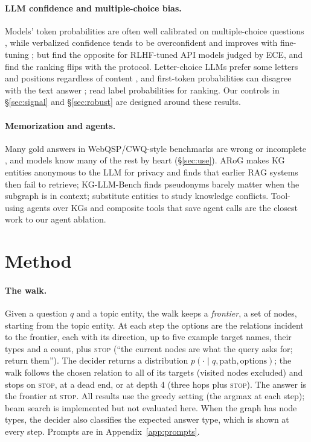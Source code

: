 \documentclass[11pt]{article}
\newcommand{\stopop}{\textsc{stop}}
\begin{document}
\paragraph{LLM confidence and multiple-choice bias.} Models' token probabilities
are often well calibrated on multiple-choice questions \citep{kadavath2022know}, while
verbalized confidence tends to be overconfident \citep{xiong2024express} and improves
with fine-tuning \citep{kapoor2024taught}; but \citet{tian2023just} find the opposite for RLHF-tuned API models judged by ECE, and
\citet{kim2026same} find the ranking flips with the protocol. Letter-choice LLMs prefer
some letters and positions regardless of content \citep{zheng2024mcq,pezeshkpour2024order},
and first-token probabilities can disagree with the text answer \citep{wang2024answerc};
\citet{zhuang2024beyond} read label probabilities for ranking. Our controls in
\S\ref{sec:signal} and \S\ref{sec:robust} are designed around these results.

\paragraph{Memorization and agents.} Many gold answers in WebQSP/CWQ-style benchmarks
are wrong or incomplete \citep{zhang2025kgqagen}, and models know many of the rest by
heart (\S\ref{sec:use}). ARoG \citep{ning2026arog} makes KG entities anonymous to the
LLM for privacy and finds that earlier RAG systems then fail to retrieve; KG-LLM-Bench
\citep{markowitz2025kgllmbench} finds pseudonyms barely matter when the subgraph is in
context; \citet{longpre2021entity} substitute entities to study knowledge conflicts.
Tool-using agents over KGs \citep{gu2024middleware} and composite tools that save agent
calls \citep{abuzakuk2026awo} are the closest work to our agent ablation.

\section{Method}
\label{sec:method}

\paragraph{The walk.} Given a question $q$ and a topic entity, the walk keeps a
\emph{frontier}, a set of nodes, starting from the topic entity. At each step the
options are the relations incident to the frontier, each with its direction, up to
five example target names, their types and a count, plus \stopop{} (``the current
nodes are what the query asks for; return them''). The decider returns a distribution
$p(\cdot \mid q, \text{path}, \text{options})$; the walk follows the chosen relation to
all of its targets (visited nodes excluded) and stops on \stopop{}, at a dead end, or at
depth 4 (three hops plus \stopop{}). The answer is the frontier at \stopop{}. All
results use the greedy setting (the argmax at each step); beam search is implemented
but not evaluated here. When the graph has node types, the decider also classifies the
expected answer type, which is shown at every step. Prompts are in
Appendix~\ref{app:prompts}.
\end{document}

